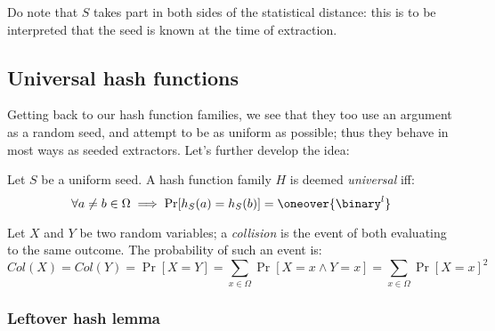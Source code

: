 Do note that $S$ takes part in both sides of the statistical distance: this is to be interpreted that the seed is known at the time of extraction.

\subsection{Universal hash functions}

Getting back to our hash function families, we see that they too use an argument as a random seed, and attempt to be as uniform as possible; thus they behave in most ways as seeded extractors. Let's further develop the idea:

\begin{definition}
    Let $S$ be a uniform seed. A hash function family $H$ is deemed \emph{universal} iff:
    \[
        \forall a \neq b \in \Omega \implies \Pr[h_S(a) = h_S(b)] = \oneover{\binary^l}
    \]
\end{definition}

\begin{definition}
    Let $X$ and $Y$ be two \iid{} random variables; a \emph{collision} is the event of both evaluating to the same outcome. The probability of such an event is:
    \[
        Col(X) = Col(Y) = \Pr[X = Y] = \sum_{x \in \Omega}\Pr[X = x \wedge Y = x] = \sum_{x \in \Omega}\Pr[X = x]^2
    \]
\end{definition}

\subsubsection{Leftover hash lemma}

\todo{---}
